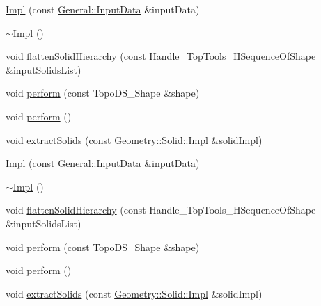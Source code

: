 \begin{DoxyCompactItemize}
\item 
\hyperlink{classMcCAD_1_1Decomposition_1_1Decompose_1_1Impl_a24332343b354e30f922a867e90631d6c}{Impl} (const \hyperlink{classMcCAD_1_1General_1_1InputData}{General\+::\+Input\+Data} \&input\+Data)
\item 
\hyperlink{classMcCAD_1_1Decomposition_1_1Decompose_1_1Impl_a79fb6438d2360f5842f2c0fa6ba493fb}{$\sim$\+Impl} ()
\item 
void \hyperlink{classMcCAD_1_1Decomposition_1_1Decompose_1_1Impl_ab0605ffa40a113571d949c93e5994122}{flatten\+Solid\+Hierarchy} (const Handle\+\_\+\+Top\+Tools\+\_\+\+H\+Sequence\+Of\+Shape \&input\+Solids\+List)
\item 
void \hyperlink{classMcCAD_1_1Decomposition_1_1Decompose_1_1Impl_a6a1e518d8eee8a533ccb74fd974af2ca}{perform} (const Topo\+D\+S\+\_\+\+Shape \&shape)
\item 
void \hyperlink{classMcCAD_1_1Decomposition_1_1Decompose_1_1Impl_a71700a5c5ec1eaa1b414cb232d1a073b}{perform} ()
\item 
void \hyperlink{classMcCAD_1_1Decomposition_1_1Decompose_1_1Impl_a72d35db075f7a695c1bf3f99ccf8d8a8}{extract\+Solids} (const \hyperlink{classMcCAD_1_1Geometry_1_1Solid_1_1Impl}{Geometry\+::\+Solid\+::\+Impl} \&solid\+Impl)
\item 
\hyperlink{classMcCAD_1_1Decomposition_1_1Decompose_1_1Impl_a24332343b354e30f922a867e90631d6c}{Impl} (const \hyperlink{classMcCAD_1_1General_1_1InputData}{General\+::\+Input\+Data} \&input\+Data)
\item 
\hyperlink{classMcCAD_1_1Decomposition_1_1Decompose_1_1Impl_a79fb6438d2360f5842f2c0fa6ba493fb}{$\sim$\+Impl} ()
\item 
void \hyperlink{classMcCAD_1_1Decomposition_1_1Decompose_1_1Impl_ab0605ffa40a113571d949c93e5994122}{flatten\+Solid\+Hierarchy} (const Handle\+\_\+\+Top\+Tools\+\_\+\+H\+Sequence\+Of\+Shape \&input\+Solids\+List)
\item 
void \hyperlink{classMcCAD_1_1Decomposition_1_1Decompose_1_1Impl_a6a1e518d8eee8a533ccb74fd974af2ca}{perform} (const Topo\+D\+S\+\_\+\+Shape \&shape)
\item 
void \hyperlink{classMcCAD_1_1Decomposition_1_1Decompose_1_1Impl_a71700a5c5ec1eaa1b414cb232d1a073b}{perform} ()
\item 
void \hyperlink{classMcCAD_1_1Decomposition_1_1Decompose_1_1Impl_a72d35db075f7a695c1bf3f99ccf8d8a8}{extract\+Solids} (const \hyperlink{classMcCAD_1_1Geometry_1_1Solid_1_1Impl}{Geometry\+::\+Solid\+::\+Impl} \&solid\+Impl)
\end{DoxyCompactItemize}
